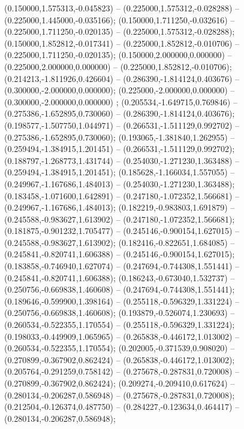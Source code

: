  (0.150000,1.575313,-0.045823) -- (0.225000,1.575312,-0.028288) -- (0.225000,1.445000,-0.035166);
 (0.150000,1.711250,-0.032616) -- (0.225000,1.711250,-0.020135) -- (0.225000,1.575312,-0.028288);
 (0.150000,1.852812,-0.017341) -- (0.225000,1.852812,-0.010706) -- (0.225000,1.711250,-0.020135);
 (0.150000,2.000000,0.000000) -- (0.225000,2.000000,0.000000) -- (0.225000,1.852812,-0.010706);
 (0.214213,-1.811926,0.426604) -- (0.286390,-1.814124,0.403676) -- (0.300000,-2.000000,0.000000);
 (0.225000,-2.000000,0.000000) -- (0.300000,-2.000000,0.000000) ;
 (0.205534,-1.649715,0.769846) -- (0.275386,-1.652895,0.730060) -- (0.286390,-1.814124,0.403676);
 (0.198577,-1.507750,1.044971) -- (0.266531,-1.511129,0.992702) -- (0.275386,-1.652895,0.730060);
 (0.193065,-1.381840,1.262955) -- (0.259494,-1.384915,1.201451) -- (0.266531,-1.511129,0.992702);
 (0.188797,-1.268773,1.431744) -- (0.254030,-1.271230,1.363488) -- (0.259494,-1.384915,1.201451);
 (0.185628,-1.166034,1.557055) -- (0.249967,-1.167686,1.484013) -- (0.254030,-1.271230,1.363488);
 (0.183458,-1.071600,1.642891) -- (0.247180,-1.072352,1.566681) -- (0.249967,-1.167686,1.484013);
 (0.182219,-0.983803,1.691879) -- (0.245588,-0.983627,1.613902) -- (0.247180,-1.072352,1.566681);
 (0.181875,-0.901232,1.705477) -- (0.245146,-0.900154,1.627015) -- (0.245588,-0.983627,1.613902);
 (0.182416,-0.822651,1.684085) -- (0.245841,-0.820741,1.606388) -- (0.245146,-0.900154,1.627015);
 (0.183858,-0.746940,1.627074) -- (0.247694,-0.744308,1.551441) -- (0.245841,-0.820741,1.606388);
 (0.186243,-0.673040,1.532737) -- (0.250756,-0.669838,1.460608) -- (0.247694,-0.744308,1.551441);
 (0.189646,-0.599900,1.398164) -- (0.255118,-0.596329,1.331224) -- (0.250756,-0.669838,1.460608);
 (0.193879,-0.526074,1.230693) -- (0.260534,-0.522355,1.170554) -- (0.255118,-0.596329,1.331224);
 (0.198033,-0.449909,1.065965) -- (0.265838,-0.446172,1.013002) -- (0.260534,-0.522355,1.170554);
 (0.202005,-0.371539,0.908020) -- (0.270899,-0.367902,0.862424) -- (0.265838,-0.446172,1.013002);
 (0.205764,-0.291259,0.758142) -- (0.275678,-0.287831,0.720008) -- (0.270899,-0.367902,0.862424);
 (0.209274,-0.209410,0.617624) -- (0.280134,-0.206287,0.586948) -- (0.275678,-0.287831,0.720008);
 (0.212504,-0.126374,0.487750) -- (0.284227,-0.123634,0.464417) -- (0.280134,-0.206287,0.586948);
